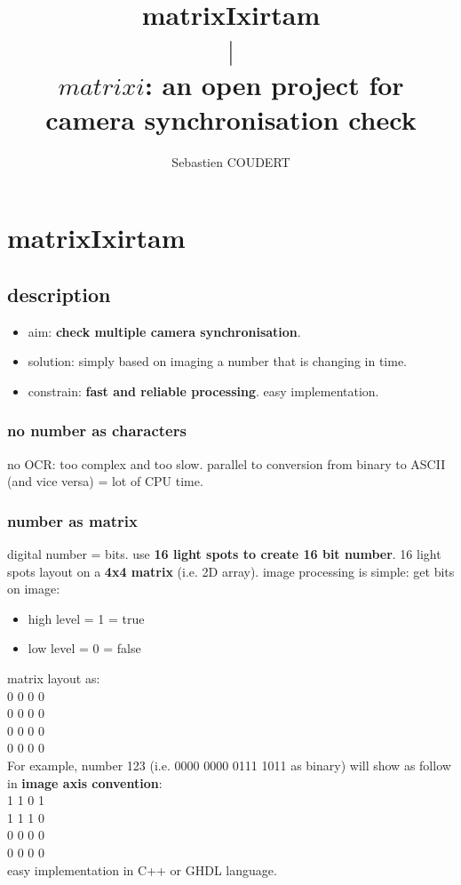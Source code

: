 \documentclass[10pt,a4paper]{report}
\title{matrixIxirtam\\$\mid$\\$matrixi$: an open project for\\camera synchronisation check}
\author{Sebastien COUDERT}
\begin{document}
\maketitle
\tableofcontents

\chapter{matrixIxirtam}
\section{description}
\begin{itemize}
\item aim: \textbf{check multiple camera synchronisation}.
\item solution: simply based on imaging a number that is changing in time.
\item constrain: \textbf{fast and reliable processing}. easy implementation.
\end{itemize}
\subsection{no number as characters}
no OCR: too complex and too slow.
parallel to conversion from binary to ASCII (and vice versa) = lot of CPU time.
\subsection{number as matrix}
digital number = bits.
use \textbf{16 light spots to create 16 bit number}.
16 light spots layout on a \textbf{4x4 matrix} (i.e. 2D array).
image processing is simple: get bits on image:
\begin{itemize}
\item high level = 1 = true
\item low level = 0 = false
\end{itemize}
matrix layout as:\\
0 0 0 0\\
0 0 0 0\\
0 0 0 0\\
0 0 0 0\\
For example, number 123 (i.e. 0000 0000 0111 1011 as binary) will show as follow in \textbf{image axis convention}:\\
1 1 0 1\\
1 1 1 0\\
0 0 0 0\\
0 0 0 0\\
easy implementation in C++ or GHDL language.
\end{document}
